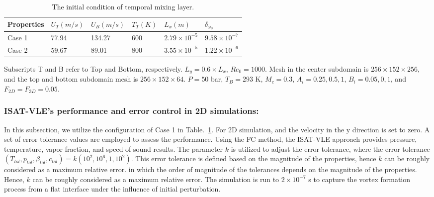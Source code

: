 \begin{table}
    \caption{The initial condition of temporal mixing layer.}\label{TML_init_table}
    \begin{threeparttable} 
\begin{tabular*}{0.8\textwidth}{@{} l|lllll@{}}
    \toprule
    Properties     & $U_T (m/s)$   & $U_B (m/s)$  & $T_T (K)$   & $L_x (m)$ & $\delta_{\omega_0}$\\
    \midrule
    Case 1         & 77.94         & 134.27       & 600         & $2.79 \times 10^{-5}$   & $9.58 \times 10^{-7}$   \\
    Case 2         & 59.67         & 89.01        & 800         & $3.55 \times 10^{-5}$   & $1.22\times 10^{-6}$    \\
    \bottomrule
\end{tabular*}
\begin{tablenotes}
    \footnotesize    
    \item Subscripts T and B refer to Top and Bottom, respectively. $L_y = 0.6\times L_x$,  $Re_0=1000$. Mesh in the center subdomain is $256\times 152 \times 256$, and the top and bottom subdomain mesh is $256\times 152\times 64$. $P = 50$ bar, $T_B=293$ K, $M_c = 0.3$, $A_i = 0.25, 0.5, 1$, $B_i = 0.05, 0, 1$, and $F_{2D}= F_{3D} = 0.05$.\\
  \end{tablenotes}
\end{threeparttable}
\end{table}



\subsubsection{ISAT-VLE's performance and error control in 2D simulations:}





In this subsection, we utilize the configuration of Case 1 in Table.~\ref{TML_init_table}. For 2D simulation, and the velocity in the y direction is set to zero. A set of error tolerance values are employed to assess the performance.  Using the FC method, the ISAT-VLE approach provides pressure, temperature, vapor fraction, and speed of sound results. The parameter $k$ is utilized to adjust the error tolerance, where the error tolerance $(T_{tol},p_{tol},\beta_{tol},c_{tol})= k (10^2, 10^6, 1, 10^2)$. This error tolerance is defined based on the magnitude of the properties, hence $k$ can be roughly considered as a maximum relative error. in which the order of magnitude of the tolerances depends on the magnitude of the properties. Hence, $k$ can be roughly considered as a maximum relative error. The simulation is run to $2\times 10^{-7}$ s to capture the vortex formation process from a flat interface under the influence of initial perturbation. 

